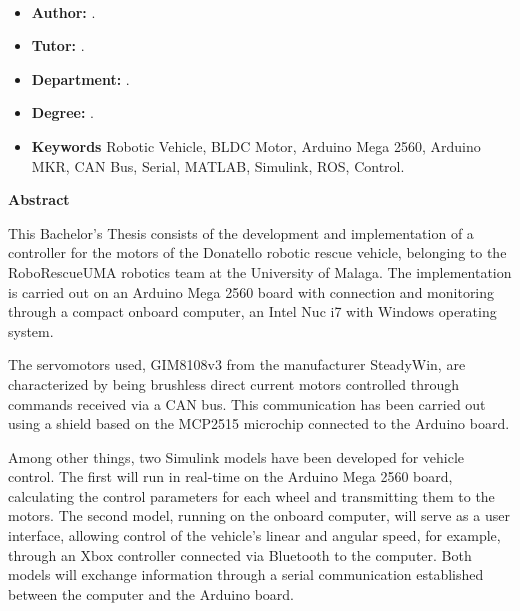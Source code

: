 \blankpage

\begin{center}
    {\fontsize{20}{30}\selectfont \textbf{\tfgEnglishTitle}\\}
\end{center}
\bigskip

\begin{itemize}
    \item \large \textbf{Author:} \tfgAuthor.
    \item \large \textbf{Tutor:} \tfgTutor.
    \item \large \textbf{Department:} \tfgEnglishDepartment.
    \item \large \textbf{Degree:} \tfgEnglishGrade.
    \item \large \textbf{Keywords} Robotic Vehicle, BLDC Motor, Arduino Mega 2560, Arduino MKR, CAN Bus, Serial, MATLAB, Simulink, ROS, Control.
\end{itemize}
\begin{center}
    {\fontsize{15}{40}\selectfont \textbf{Abstract}\\}
\end{center}
\bigskip

This Bachelor's Thesis consists of the development and implementation of a controller for the motors of the Donatello robotic rescue vehicle, belonging to the RoboRescueUMA robotics team at the University of Malaga. The implementation is carried out on an Arduino Mega 2560 board with connection and monitoring through a compact onboard computer, an Intel Nuc i7 with Windows operating system. 

The servomotors used, GIM8108v3 from the manufacturer SteadyWin, are characterized by being brushless direct current motors controlled through commands received via a CAN bus. This communication has been carried out using a shield based on the MCP2515 microchip connected to the Arduino board. 

Among other things, two Simulink models have been developed for vehicle control. The first will run in real-time on the Arduino Mega 2560 board, calculating the control parameters for each wheel and transmitting them to the motors. The second model, running on the onboard computer, will serve as a user interface, allowing control of the vehicle's linear and angular speed, for example, through an Xbox controller connected via Bluetooth to the computer. Both models will exchange information through a serial communication established between the computer and the Arduino board.

\blankpage